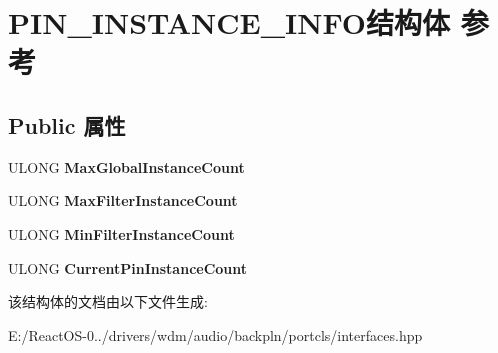 \hypertarget{struct_p_i_n___i_n_s_t_a_n_c_e___i_n_f_o}{}\section{P\+I\+N\+\_\+\+I\+N\+S\+T\+A\+N\+C\+E\+\_\+\+I\+N\+F\+O结构体 参考}
\label{struct_p_i_n___i_n_s_t_a_n_c_e___i_n_f_o}
\subsection*{Public 属性}
\begin{DoxyCompactItemize}
\item 
\mbox{\label{struct_p_i_n___i_n_s_t_a_n_c_e___i_n_f_o_a3e0baf056ed4818795eb6f93742b1cd3}} 
U\+L\+O\+NG {\bfseries Max\+Global\+Instance\+Count}
\item 
\mbox{\label{struct_p_i_n___i_n_s_t_a_n_c_e___i_n_f_o_a9fcc1e1fcf54d0284d808ffd179a3b04}} 
U\+L\+O\+NG {\bfseries Max\+Filter\+Instance\+Count}
\item 
\mbox{\label{struct_p_i_n___i_n_s_t_a_n_c_e___i_n_f_o_a40945caf2bc9c8b27890c4545a81efda}} 
U\+L\+O\+NG {\bfseries Min\+Filter\+Instance\+Count}
\item 
\mbox{\label{struct_p_i_n___i_n_s_t_a_n_c_e___i_n_f_o_ad435000341fb510d2aa49563dacf8054}} 
U\+L\+O\+NG {\bfseries Current\+Pin\+Instance\+Count}
\end{DoxyCompactItemize}


该结构体的文档由以下文件生成\+:\begin{DoxyCompactItemize}
\item 
E\+:/\+React\+O\+S-\/0../drivers/wdm/audio/backpln/portcls/interfaces.\+hpp\end{DoxyCompactItemize}
